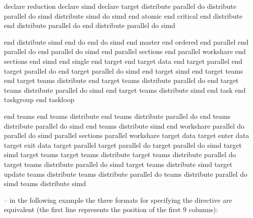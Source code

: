 \begin{indentedcodelist}
declare reduction
declare simd
declare target
distribute parallel do
distribute parallel do simd
distribute simd
do simd
end atomic
end critical
end distribute 
end distribute parallel do
end distribute parallel do simd
\end{indentedcodelist}
\pagebreak
\begin{figure}[t!]
\end{figure}
\begin{indentedcodelist}
end distribute simd
end do
end do simd
end master
end ordered
end parallel
end parallel do
end parallel do simd
end parallel sections
end parallel workshare
end sections
end simd
end single
end target
end target data
end target parallel
end target parallel do
end target parallel do simd
end target simd
end target teams
end target teams distribute
end target teams distribute parallel do
end target teams distribute parallel do simd
end target teams distribute simd
end task
end taskgroup
end taskloop
\end{indentedcodelist}
\pagebreak
\begin{figure}[t!]
\end{figure}
\begin{indentedcodelist}
end teams
end teams distribute
end teams distribute parallel do
end teams distribute parallel do simd
end teams distribute simd
end workshare
parallel do
parallel do simd
parallel sections
parallel workshare
target data
target enter data
target exit data
target parallel
target parallel do
target parallel do simd
target simd
target teams
target teams distribute
target teams distribute parallel do
target teams distribute parallel do simd
target teams distribute simd
target update
teams distribute
teams distribute parallel do
teams distribute parallel do simd
teams distribute simd
\end{indentedcodelist}

\notestart
\noteheader – in the following example the three formats for specifying the directive are 
equivalent (the first line represents the position of the first 9 columns):

\begin{alltt}
\end{alltt}
\noteend
\bigskip
\fortranspecificend








